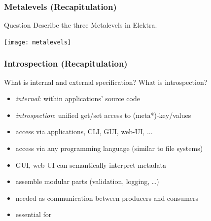 \begin{frame}
	\frametitle{Metalevels (Recapitulation)}
	\begin{alertblock}{Question}
	Describe the three Metalevels in Elektra.
	\end{alertblock}

	\pause
	\texttt{[image: metalevels]}
\end{frame}

\begin{frame}
	\frametitle{Introspection (Recapitulation)}
	\begin{task}
	What is internal and external specification?
	What is introspection?
	\end{task}

	\pause
	\vspace{1em}

	\begin{itemize}
	\item \textit{internal}: within applications' source code
	\item \textit{introspection}: unified get/set access to (meta*)-key/values
	\item access via applications, CLI, GUI, web-UI, ...
	\item access via any programming language (similar to file systems)
	\item GUI, web-UI can semantically interpret metadata
	\item assemble modular parts (validation, logging, \dots)
	\item needed as communication between producers and consumers
	\item essential for ~\citet{holland2001nofutz}
	\end{itemize}
\end{frame}

